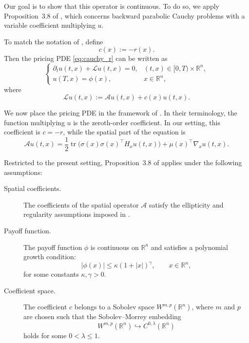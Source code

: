Our goal is to show that this operator is continuous. To do so, we apply Proposition~3.8 of \citet{Benth2024}, which concerns backward parabolic Cauchy problems with a variable coefficient multiplying $u$.

To match the notation of \citet{Benth2024}, define
\[
    c(x):=-r(x).
\]
Then the pricing PDE \eqref{eq:cauchy_r} can be written as
\begin{equation}
\begin{cases}
    \partial_t u(t,x)+\mathcal{L}u(t,x)=0,
    & (t,x)\in[0,T)\times\mathbb{R}^n,\\[4pt]
    u(T,x)=\phi(x),
    & x\in\mathbb{R}^n,
\end{cases}
\label{eq:cauchy}
\end{equation}
where
\begin{equation}
    \mathcal{L}u(t,x):=\mathcal{A}u(t,x)+c(x)u(t,x).
\label{eq:Loperator}
\end{equation}

We now place the pricing PDE in the framework of \citet{Benth2024}. In their terminology, the function multiplying $u$ is the zeroth-order coefficient. In our setting, this coefficient is $c=-r$, while the spatial part of the equation is
\[
    \mathcal{A}u(t,x)
    =
    \frac12 \operatorname{tr}\!\big(\sigma(x)\sigma(x)^\top H_xu(t,x)\big)
    + \mu(x)^\top \nabla_xu(t,x).
\]

Restricted to the present setting, Proposition~3.8 of \citet{Benth2024} applies under the following assumptions:

\begin{description}
    \item[Spatial coefficients.] The coefficients of the spatial operator $\mathcal{A}$ satisfy the ellipticity and regularity assumptions imposed in \citet{Benth2024}.
    
    \item[Payoff function.] The payoff function $\phi$ is continuous on $\mathbb{R}^n$ and satisfies a polynomial growth condition:
    \[
        |\phi(x)| \leq \kappa(1+|x|)^\gamma,
        \qquad x\in\mathbb{R}^n,
    \]
    for some constants $\kappa,\gamma>0$.
    
    \item[Coefficient space.] The coefficient $c$ belongs to a Sobolev space $W^{m,p}(\mathbb{R}^n)$, where $m$ and $p$ are chosen such that the Sobolev--Morrey embedding
    \[
        W^{m,p}(\mathbb{R}^n)\hookrightarrow C^{0,\lambda}(\mathbb{R}^n)
    \]
    holds for some $0<\lambda\leq1$.
\end{description}

